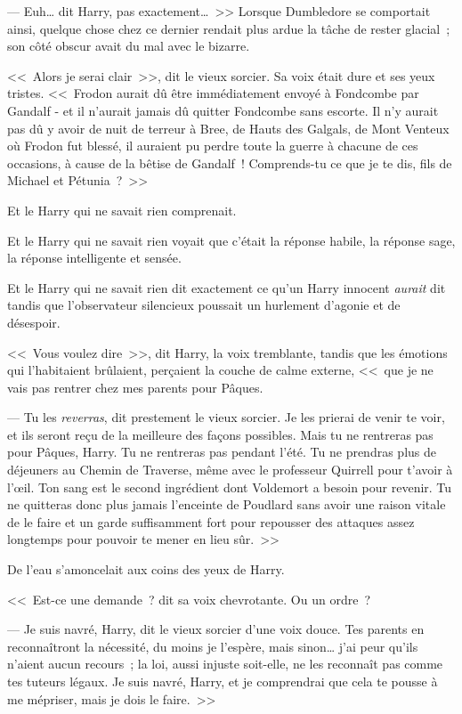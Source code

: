 --- Euh… dit Harry, pas exactement…~>> Lorsque Dumbledore se comportait ainsi, quelque chose chez ce dernier rendait plus ardue la tâche de rester glacial~; son côté obscur avait du mal avec le bizarre.

<<~Alors je serai clair~>>, dit le vieux sorcier. Sa voix était dure et ses yeux tristes. <<~Frodon aurait dû être immédiatement envoyé à Fondcombe par Gandalf - et il n'aurait jamais dû quitter Fondcombe sans escorte. Il n'y aurait pas dû y avoir de nuit de terreur à Bree, de Hauts des Galgals, de Mont Venteux où Frodon fut blessé, il auraient pu perdre toute la guerre à chacune de ces occasions, à cause de la bêtise de Gandalf~! Comprends-tu ce que je te dis, fils de Michael et Pétunia~?~>>

Et le Harry qui ne savait rien comprenait.

Et le Harry qui ne savait rien voyait que c'était la réponse habile, la réponse sage, la réponse intelligente et sensée.

Et le Harry qui ne savait rien dit exactement ce qu'un Harry innocent \emph{aurait} dit tandis que l'observateur silencieux poussait un hurlement d'agonie et de désespoir.

<<~Vous voulez dire~>>, dit Harry, la voix tremblante, tandis que les émotions qui l'habitaient brûlaient, perçaient la couche de calme externe, <<~que je ne vais pas rentrer chez mes parents pour Pâques.

--- Tu les \emph{reverras}, dit prestement le vieux sorcier. Je les prierai de venir te voir, et ils seront reçu de la meilleure des façons possibles. Mais tu ne rentreras pas pour Pâques, Harry. Tu ne rentreras pas pendant l'été. Tu ne prendras plus de déjeuners au Chemin de Traverse, même avec le professeur Quirrell pour t'avoir à l'œil. Ton sang est le second ingrédient dont Voldemort a besoin pour revenir. Tu ne quitteras donc plus jamais l'enceinte de Poudlard sans avoir une raison vitale de le faire et un garde suffisamment fort pour repousser des attaques assez longtemps pour pouvoir te mener en lieu sûr.~>>

De l'eau s'amoncelait aux coins des yeux de Harry.

<<~Est-ce une demande~? dit sa voix chevrotante. Ou un ordre~?

--- Je suis navré, Harry, dit le vieux sorcier d'une voix douce. Tes parents en reconnaîtront la nécessité, du moins je l'espère, mais sinon… j'ai peur qu'ils n'aient aucun recours~; la loi, aussi injuste soit-elle, ne les reconnaît pas comme tes tuteurs légaux. Je suis navré, Harry, et je comprendrai que cela te pousse à me mépriser, mais je dois le faire.~>>

